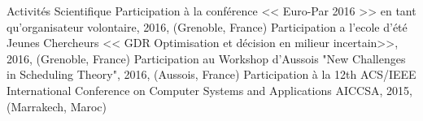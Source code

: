 \begin{rubric}{Activités Scientifique}
\entry*[]	Participation à la conférence << Euro-Par 2016 >> en tant qu'organisateur volontaire, 2016, (Grenoble, France) 
\entry*[]	Participation a l'ecole d'été Jeunes Chercheurs << GDR Optimisation et décision en milieur incertain>>, 2016, (Grenoble, France)	
\entry*[]	Participation au Workshop d'Aussois "New Challenges in Scheduling Theory", 2016, (Aussois, France)	
\entry*[]	Participation à la 12th ACS/IEEE International Conference on Computer Systems and Applications AICCSA, 2015, (Marrakech, Maroc) 	
\end{rubric}
